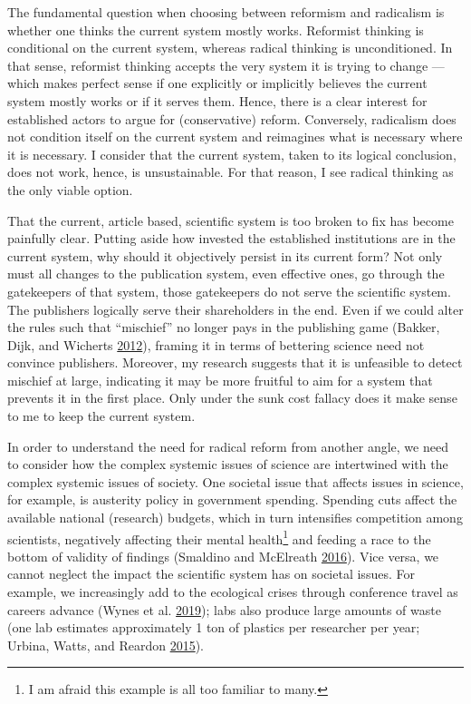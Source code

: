 \documentclass[a5paper]{book}
\let\rmarkdownfootnote\footnote%
\def\footnote{\protect\rmarkdownfootnote}
\begin{document}
The fundamental question when choosing between reformism and radicalism
is whether one thinks the current system mostly works. Reformist
thinking is conditional on the current system, whereas radical thinking
is unconditioned. In that sense, reformist thinking accepts the very
system it is trying to change --- which makes perfect sense if one
explicitly or implicitly believes the current system mostly works or if
it serves them. Hence, there is a clear interest for established actors
to argue for (conservative) reform. Conversely, radicalism does not
condition itself on the current system and reimagines what is necessary
where it is necessary. I consider that the current system, taken to its
logical conclusion, does not work, hence, is unsustainable. For that
reason, I see radical thinking as the only viable option.

That the current, article based, scientific system is too broken to fix
has become painfully clear. Putting aside how invested the established
institutions are in the current system, why should it objectively
persist in its current form? Not only must all changes to the
publication system, even effective ones, go through the gatekeepers of
that system, those gatekeepers do not serve the scientific system. The
publishers logically serve their shareholders in the end. Even if we
could alter the rules such that \enquote{mischief} no longer pays in the
publishing game (Bakker, Dijk, and Wicherts
\protect\hyperlink{ref-doi:10.1177ux2f1745691612459060}{2012}), framing
it in terms of bettering science need not convince publishers. Moreover,
my research suggests that it is unfeasible to detect mischief at large,
indicating it may be more fruitful to aim for a system that prevents it
in the first place. Only under the sunk cost fallacy does it make sense
to me to keep the current system.

In order to understand the need for radical reform from another angle,
we need to consider how the complex systemic issues of science are
intertwined with the complex systemic issues of society. One societal
issue that affects issues in science, for example, is austerity policy
in government spending. Spending cuts affect the available national
(research) budgets, which in turn intensifies competition among
scientists, negatively affecting their mental health\footnote{I am
  afraid this example is all too familiar to many.} and feeding a race
to the bottom of validity of findings (Smaldino and McElreath
\protect\hyperlink{ref-doi:10.1098ux2frsos.160384}{2016}). Vice versa,
we cannot neglect the impact the scientific system has on societal
issues. For example, we increasingly add to the ecological crises
through conference travel as careers advance (Wynes et al.
\protect\hyperlink{ref-doi:10.1016ux2fj.jclepro.2019.04.109}{2019});
labs also produce large amounts of waste (one lab estimates
approximately 1 ton of plastics per researcher per year; Urbina, Watts,
and Reardon \protect\hyperlink{ref-doi:10.1038ux2f528479c}{2015}).
\end{document}
